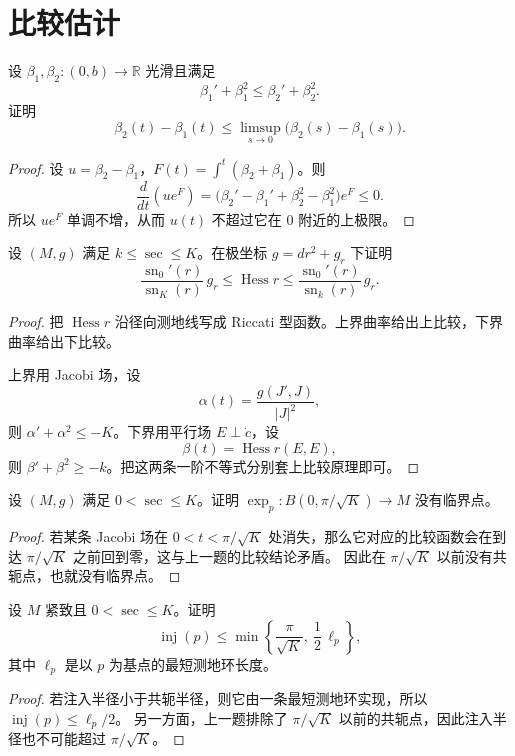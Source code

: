\documentclass[11pt,a4paper,openany]{ctexbook}
\numberwithin{equation}{chapter}
\begin{document}
\section{比较估计}

\begin{problem}
设 \(\beta_1,\beta_2\colon(0,b)\to\mathbb R\) 光滑且满足
\[
\beta_1'+\beta_1^2\le \beta_2'+\beta_2^2.
\]
证明
\[
\beta_2(t)-\beta_1(t)\le \limsup_{s\to 0}\bigl(\beta_2(s)-\beta_1(s)\bigr).
\]
\end{problem}
\begin{proof}
设 \(u=\beta_2-\beta_1\)，\(F(t)=\int^t(\beta_2+\beta_1)\)。则
\[
\frac{d}{dt}(u e^F)=\bigl(\beta_2'-\beta_1'+\beta_2^2-\beta_1^2\bigr)e^F\le 0.
\]
所以 \(u e^F\) 单调不增，从而 \(u(t)\) 不超过它在 \(0\) 附近的上极限。
\end{proof}

\begin{problem}
设 \((M,g)\) 满足 \(k\le \sec\le K\)。在极坐标 \(g=dr^2+g_r\) 下证明
\[
\frac{\operatorname{sn}_0'(r)}{\operatorname{sn}_K(r)}\,g_r\le \operatorname{Hess}r\le \frac{\operatorname{sn}_0'(r)}{\operatorname{sn}_k(r)}\,g_r.
\]
\end{problem}
\begin{proof}
把 \(\operatorname{Hess}r\) 沿径向测地线写成 Riccati 型函数。上界曲率给出上比较，下界曲率给出下比较。

上界用 Jacobi 场，设
\[
\alpha(t)=\frac{g(J',J)}{|J|^2},
\]
则 \(\alpha'+\alpha^2\le -K\)。下界用平行场 \(E\perp\dot c\)，设
\[
\beta(t)=\operatorname{Hess}r(E,E),
\]
则 \(\beta'+\beta^2\ge -k\)。把这两条一阶不等式分别套上比较原理即可。
\end{proof}

\begin{problem}
设 \((M,g)\) 满足 \(0<\sec\le K\)。证明 \( \exp_p\colon B(0,\pi/\sqrt K)\to M \) 没有临界点。
\end{problem}
\begin{proof}
若某条 Jacobi 场在 \(0<t<\pi/\sqrt K\) 处消失，那么它对应的比较函数会在到达 \(\pi/\sqrt K\) 之前回到零，这与上一题的比较结论矛盾。
因此在 \(\pi/\sqrt K\) 以前没有共轭点，也就没有临界点。
\end{proof}

\begin{problem}
设 \(M\) 紧致且 \(0<\sec\le K\)。证明
\[
\operatorname{inj}(p)\le \min\left\{\frac{\pi}{\sqrt K},\ \frac12\,\ell_p\right\},
\]
其中 \(\ell_p\) 是以 \(p\) 为基点的最短测地环长度。
\end{problem}
\begin{proof}
若注入半径小于共轭半径，则它由一条最短测地环实现，所以 \(\operatorname{inj}(p)\le \ell_p/2\)。
另一方面，上一题排除了 \(\pi/\sqrt K\) 以前的共轭点，因此注入半径也不可能超过 \(\pi/\sqrt K\)。
\end{proof}
\end{document}
